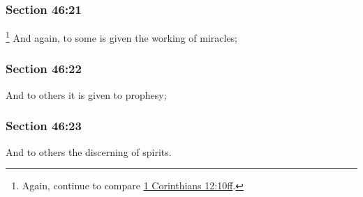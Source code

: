 	\subsubsection{Section 46:21} %
		\label{DC46-21}

			\footnote{%
				Again, continue to compare \hyperref[1CORINTHIANS-12-10]{1 Corinthians 12:10ff}.
				}%
		And again, to some is given the working of miracles;


	\subsubsection{Section 46:22} %
		\label{DC46-22}

		And to others it is given to prophesy;


	\subsubsection{Section 46:23} %
		\label{DC46-23}

		And to others the discerning of spirits.


